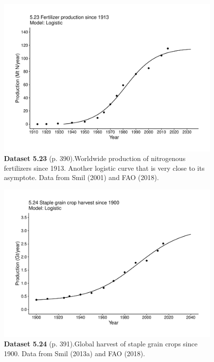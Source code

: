 \documentclass[aps,rmp,preprint,superscriptaddress,10pt,onecolumn]{article}
\begin{document}
\clearpage
\begin{figure}[h]
\includegraphics[width=\textwidth]{output/figs-ggplot/5.23.pdf}
\caption*{\textbf{Dataset 5.23} (p. 390).Worldwide production of nitrogenous fertilizers since 1913. Another logistic curve that is very close to its asymptote. Data from Smil (2001) and FAO (2018).}
\end{figure}
	
\clearpage
\begin{figure}[h]
\includegraphics[width=\textwidth]{output/figs-ggplot/5.24.pdf}
\caption*{\textbf{Dataset 5.24} (p. 391).Global harvest of staple grain crops since 1900. Data from Smil (2013a) and FAO (2018).}
\end{figure}
	
\end{document}
